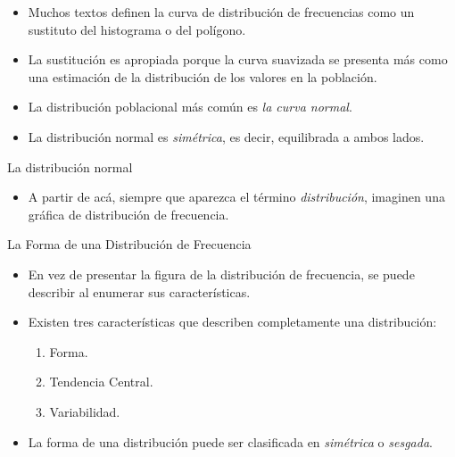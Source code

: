 \documentclass[xcolor=dvipsnames]{beamer}
\begin{document}
\begin{frame}
	\begin{itemize}
		\justifying
		\item Muchos textos definen la curva de distribución de frecuencias como un sustituto del histograma o del polígono.
		\item La sustitución es apropiada porque la curva suavizada se presenta más como una estimación de la distribución de los valores en la población. 
		\item La distribución poblacional más común es \emph{la curva normal}. 
		\item La distribución normal es \emph{simétrica}, es decir, equilibrada a ambos lados.
	\end{itemize}
\end{frame}

\begin{frame}{La distribución normal}
	\begin{center}
	\end{center}
	\begin{itemize}
		\justifying
		\item A partir de acá, siempre que aparezca el término \emph{distribución}, imaginen una gráfica de distribución de frecuencia. 
	\end{itemize}
\end{frame}

\begin{frame}{La Forma de una Distribución de Frecuencia}
	\begin{itemize}
		\justifying
		\item En vez de presentar la figura de la distribución de frecuencia, se puede describir al enumerar sus características.
		\item Existen tres características que describen completamente una distribución:
		\begin{enumerate}
			\item Forma.
			\item Tendencia Central.
			\item Variabilidad.
		\end{enumerate}
		\item La forma de una distribución puede ser clasificada en \emph{simétrica} o \emph{sesgada}. \end{itemize}
\end{frame}
\end{document}
